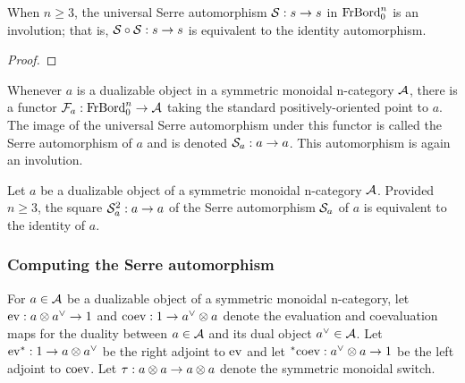 \documentclass{amsart}
\begin{document}

\begin{proposition}
When $n \geq 3$, the universal Serre automorphism $\mathcal S: s \rightarrow s$ in $\mathrm{FrBord}_0^n$ is an involution; that is, $\mathcal S \circ \mathcal S : s \rightarrow s$ is equivalent to the identity automorphism.
\end{proposition}

\begin{proof}
\end{proof}

Whenever $a$ is a dualizable object in a symmetric monoidal n-category $\mathcal A$, there is a functor $\mathcal F_a: \mathrm{FrBord}_0^n \rightarrow \mathcal A$ taking the standard positively-oriented point to $a$.  The image of the universal Serre automorphism under this functor is called the Serre automorphism of $a$ and is denoted $\mathcal S_a : a \rightarrow a$.  This automorphism is again an involution.

\begin{corollary} \label{cor-serreinvol}
Let $a$ be a dualizable object of a symmetric monoidal n-category $\mathcal A$.  Provided $n \geq 3$, the square $\mathcal S_a^2 : a \rightarrow a$ of the Serre automorphism $\mathcal S_a$ of $a$ is equivalent to the identity of $a$.
\end{corollary}



\subsubsection{Computing the Serre automorphism} \label{sec-serre-comp}


For $a \in \mathcal A$ be a dualizable object of a symmetric monoidal n-category, let $\mathrm{ev} : a \otimes a^{\vee} \rightarrow 1$ and $\mathrm{coev}: 1 \rightarrow a^{\vee} \otimes a$ denote the evaluation and coevaluation maps for the duality between $a \in \mathcal A$ and its dual object $a^{\vee} \in \mathcal A$.  Let ${\mathrm{ev}}^*: 1 \rightarrow a \otimes a^{\vee}$ be the right adjoint to $\mathrm{ev}$ and let ${}^*{\mathrm{coev}}: a^{\vee} \otimes a \rightarrow 1$ be the left adjoint to $\mathrm{coev}$.  Let $\tau: a \otimes a \rightarrow a \otimes a$ denote the symmetric monoidal switch.
\end{document}
